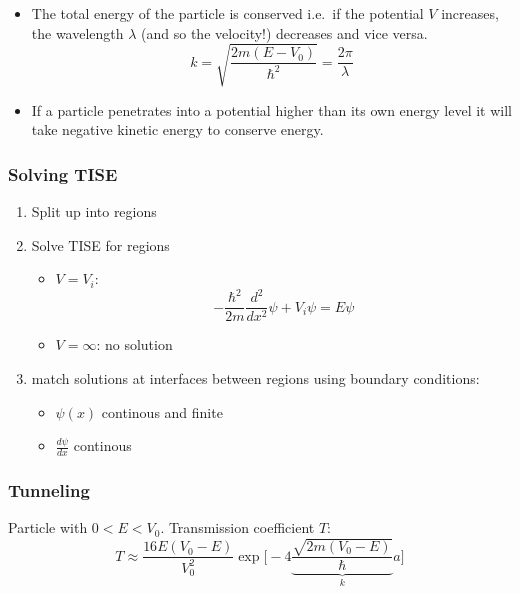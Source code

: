 \begin{itemize}
    \item The total energy of the particle is conserved i.e.\ if the potential $V$ increases, the wavelength $\lambda$ (and so the velocity!) decreases and vice versa.
          \noindent\begin{equation*}
              k=\sqrt{\frac{2m(E-V_0)}{\hbar^2}} = \frac{2\pi}{\lambda}
          \end{equation*}
    \item If a particle penetrates into a potential higher than its own energy level it will take negative kinetic energy to conserve energy.
\end{itemize}

\subsubsection{Solving TISE}
\begin{enumerate}
    \item Split up into regions
    \item Solve TISE for regions
          \begin{itemize}
              \item $V=V_i$:
                    \noindent\begin{equation*}
                        -\frac{\hbar^2}{2m}\frac{d^2}{dx^2} \psi + V_i\psi=E\psi
                    \end{equation*}
              \item $V=\infty$: no solution
          \end{itemize}
    \item match solutions at interfaces between regions using boundary conditions:
          \begin{itemize}
              \item $\psi(x)$ continous and finite
              \item $\frac{d\psi}{dx}$ continous
          \end{itemize}
\end{enumerate}

\subsubsection{Tunneling}
Particle with $0<E<V_0$. Transmission coefficient $T$:
\noindent\begin{equation*}
    T\approx\frac{16E(V_0-E)}{V_0^2}\exp\Biggl[-4 \underbrace{\frac{\sqrt{2m(V_0-E)}}{\hbar}}_{k} a\Biggr]
\end{equation*}

